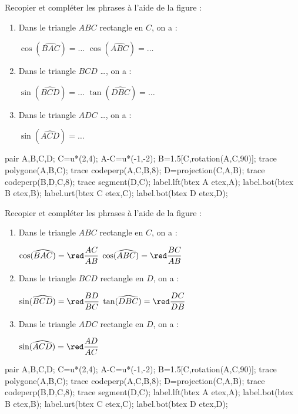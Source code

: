 \begin{exercice*}
    Recopier et compléter les phrases à l'aide de la figure :
    \begin{enumerate}
        \item Dans le triangle $ABC$ rectangle en $C$, on a :
        
        $\cos(\widehat{BAC})=\dots$ \hfill $\cos(\widehat{ABC})=\dots$
        \item Dans le triangle $BCD$ \dots{}, on a :
        
        $\sin(\widehat{BCD})=\dots$ \hfill $\tan(\widehat{DBC})=\dots$
        \item Dans le triangle $ADC$ \dots{}, on a :
        
        $\sin(\widehat{ACD})=\dots$
    \end{enumerate}

    \begin{Geometrie}[CoinHD={(7.5u,4.5u)}]        
        pair A,B,C,D;
        C=u*(2,4);
        A-C=u*(-1,-2);
        B=1.5[C,rotation(A,C,90)];
        trace polygone(A,B,C);            
        trace codeperp(A,C,B,8);
        D=projection(C,A,B);
        trace codeperp(B,D,C,8);
        trace segment(D,C);
        label.lft(btex A etex,A);
        label.bot(btex B etex,B);
        label.urt(btex C etex,C);
        label.bot(btex D etex,D);
    \end{Geometrie}
\end{exercice*}
\begin{corrige}
    Recopier et compléter les phrases à l'aide de la figure :
    
    \begin{enumerate}
        \item Dans le triangle $ABC$ rectangle en $C$, on a :
        
        $\cos(\widehat{BAC})={\red\dfrac{AC}{AB}}$ \hfill $\cos(\widehat{ABC})={\red\dfrac{BC}{AB}}$
        \item Dans le triangle $BCD$ {\red rectangle en $D$}, on a :
        
        $\sin(\widehat{BCD})={\red\dfrac{BD}{BC}}$ \hfill $\tan(\widehat{DBC})={\red\dfrac{DC}{DB}}$
        \item Dans le triangle $ADC$ {\red rectangle en $D$}, on a :
        
        $\sin(\widehat{ACD})={\red\dfrac{AD}{AC}}$
    \end{enumerate}

    \begin{Geometrie}[CoinHD={(7.5u,4.5u)}]        
        pair A,B,C,D;
        C=u*(2,4);
        A-C=u*(-1,-2);
        B=1.5[C,rotation(A,C,90)];
        trace polygone(A,B,C);            
        trace codeperp(A,C,B,8);
        D=projection(C,A,B);
        trace codeperp(B,D,C,8);
        trace segment(D,C);
        label.lft(btex A etex,A);
        label.bot(btex B etex,B);
        label.urt(btex C etex,C);
        label.bot(btex D etex,D);
    \end{Geometrie}
\end{corrige}

